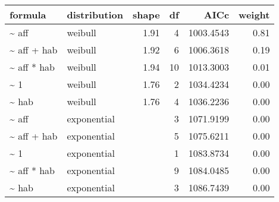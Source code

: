 \begin{table}[ht]
\centering
\begin{tabular}{llrrrr}
 formula & distribution & shape & df & AICc & weight \\ 
  \hline
\~{} aff & weibull & 1.91 & 4 & 1003.4543 & 0.81 \\ 
  \~{} aff + hab & weibull & 1.92 & 6 & 1006.3618 & 0.19 \\ 
  \~{} aff * hab & weibull & 1.94 & 10 & 1013.3003 & 0.01 \\ 
  \~{} 1 & weibull & 1.76 & 2 & 1034.4234 & 0.00 \\ 
  \~{} hab & weibull & 1.76 & 4 & 1036.2236 & 0.00 \\ 
  \~{} aff & exponential &  & 3 & 1071.9199 & 0.00 \\ 
  \~{} aff + hab & exponential &  & 5 & 1075.6211 & 0.00 \\ 
  \~{} 1 & exponential &  & 1 & 1083.8734 & 0.00 \\ 
  \~{} aff * hab & exponential &  & 9 & 1084.0485 & 0.00 \\ 
  \~{} hab & exponential &  & 3 & 1086.7439 & 0.00 \\ 
  \end{tabular}
\label{tab:brach}
\end{table}

